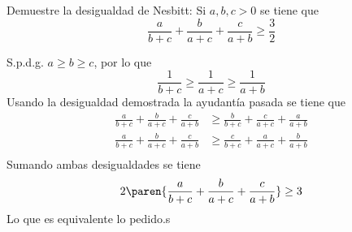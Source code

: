 \documentclass{ayudantia}
\begin{document}
\begin{prob}
    Demuestre la desigualdad de Nesbitt: Si \(a,b,c>0\) se tiene que
    \begin{equation*}
        \frac{a}{b+c}+\frac{b}{a+c}+\frac{c}{a+b}\geq\frac32
    \end{equation*}
\end{prob}

\begin{ans}
    \begin{sol}
        S.p.d.g. \(a\geq b\geq c\), por lo que
        \begin{equation*}
            \frac1{b+c}\geq\frac1{a+c}\geq\frac1{a+b}
        \end{equation*}
        Usando la desigualdad demostrada la ayudantía pasada se tiene que
        \begin{align*}
            \frac{a}{b+c}+\frac{b}{a+c}+\frac{c}{a+b}&\geq\frac{b}{b+c}+\frac{c}{a+c}+\frac{a}{a+b}\\
            \frac{a}{b+c}+\frac{b}{a+c}+\frac{c}{a+b}&\geq\frac{c}{b+c}+\frac{a}{a+c}+\frac{b}{a+b}\\
        \end{align*}
        Sumando ambas desigualdades se tiene
        \begin{equation*}
            2\paren{\frac{a}{b+c}+\frac{b}{a+c}+\frac{c}{a+b}}\geq3
        \end{equation*}
        Lo que es equivalente lo pedido.s
    \end{sol}
\end{ans}
\end{document}
